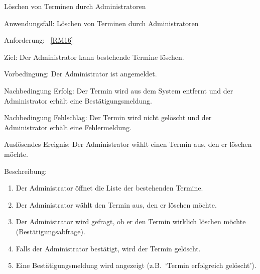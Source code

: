 \begin{function}{40}{Löschen von Terminen durch Administratoren}
    \item[Anwendungsfall:] Löschen von Terminen durch Administratoren
    \item[Anforderung:] ~\ref{RM16}
    \item[Ziel:] Der Administrator kann bestehende Termine löschen.
    \item[Vorbedingung:] Der Administrator ist angemeldet.
    \item[Nachbedingung Erfolg:] Der Termin wird aus dem System entfernt und der Administrator erhält eine Bestätigungsmeldung.
    \item[Nachbedingung Fehlschlag:] Der Termin wird nicht gelöscht und der Administrator erhält eine Fehlermeldung.
    \item[Auslösendes Ereignis:] Der Administrator wählt einen Termin aus, den er löschen möchte.
    \item[Beschreibung:] ~
    \begin{enumerate}
        \item Der Administrator öffnet die Liste der bestehenden Termine.
        \item Der Administrator wählt den Termin aus, den er löschen möchte.
        \item Der Administrator wird gefragt, ob er den Termin wirklich löschen möchte (Bestätigungsabfrage).
        \item Falls der Administrator bestätigt, wird der Termin gelöscht.
        \item Eine Bestätigungsmeldung wird angezeigt (z.B.\ `Termin erfolgreich gelöscht').
    \end{enumerate}
\end{function}

\pagebreak

